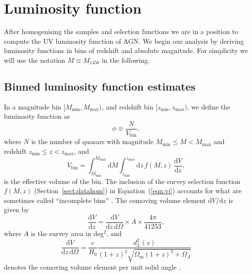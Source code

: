 \documentclass[fleqn,usenatbib]{mnras}
\begin{document}
\section{Luminosity function}
\label{sec:lf}


After homogenising the samples and selection functions we are in a position
to compute the UV luminosity function of AGN. We begin our analysis by
deriving luminosity functions in bins of redshift and absolute magnitude.
For simplicity we will use the notation $M\equiv M_{1450}$ in the following.

\subsection{Binned luminosity function estimates}
\label{sec:binnedlf}

In a magnitude bin $[M_\mathrm{min}, M_\mathrm{max})$, and redshift
  bin $[z_\mathrm{min}, z_\mathrm{max})$, we define the luminosity
function as \citep{2000MNRAS.311..433P}
\begin{equation}
  \phi \equiv \frac{N}{V_\mathrm{bin}},
\end{equation}
where $N$ is the number of quasars with magnitude
$M_\mathrm{min}\leq M<M_\mathrm{max}$ and redshift
$z_\mathrm{min}\leq z<z_\mathrm{max}$, and
\begin{equation}
  V_\mathrm{bin} = \int_{M_\mathrm{min}}^{M_\mathrm{max}}\mathrm{d}M
  \int_{z_\mathrm{min}}^{z_\mathrm{max}}\mathrm{d}z\, f(M, z)\,\frac{\mathrm{d}V}{\mathrm{d}z},
  \label{eqn:vi}
\end{equation}
is the effective volume of the bin. The inclusion of the survey selection function
$f(M,z)$ (Section~\ref{sect:datahom}) in Equation~(\ref{eqn:vi}) accounts for
what are sometimes called ``incomplete bins''
\citep{2006AJ....131.2766R}.  The comoving volume element $\mathrm{d}V/\mathrm{d}z$ is
given by
\begin{equation}
  \frac{\mathrm{d}V}{\mathrm{d}z}=\frac{\mathrm{d}V}{\mathrm{d}z\,\mathrm{d}\Omega}\times A\times\frac{4\pi}{41253},
\end{equation}
where $A$ is the survey area in deg$^2$, and 
\begin{equation}
  \frac{\mathrm{d}V}{\mathrm{d}z\,\mathrm{d}\Omega}=\frac{c}{H_0}\frac{d_L^2\left(z\right)}
       {\left(1+z\right)^2\sqrt{\Omega_\mathrm{m}\left(1+z\right)^3+\Omega_\Lambda}}
  \label{eqn:dvdzdo}
\end{equation}
denotes the comoving volume element per unit solid angle
\citep{1999astro.ph..5116H}.  
\end{document}
